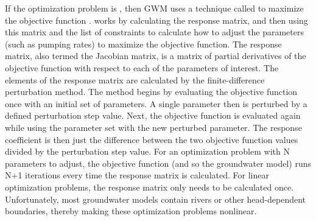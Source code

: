 \documentclass[authoryear]{elsarticle}
\begin{document}
If the optimization problem is , then GWM uses a technique called  to maximize the objective function \citep{ahlfeld2005gwm}.  works by calculating the response matrix, and then using this matrix and the list of constraints to calculate how to adjust the parameters (such as pumping rates) to maximize the objective function. The response matrix, also termed the Jacobian matrix, is a matrix of partial derivatives of the objective function with respect to each of the parameters of interest. The elements of the response matrix are calculated by the finite-difference perturbation method. The method begins by evaluating the objective function once with an initial set of parameters. A single parameter then is perturbed by a defined perturbation step value. Next, the objective function is evaluated again while using the parameter set with the new perturbed parameter. The response coefficient is then just the difference between the two objective function values divided by the perturbation step value. For an optimization problem with N parameters to adjust, the objective function (and so the groundwater model) runs N+1 iterations every time the response matrix is calculated. For linear optimization problems, the response matrix only needs to be calculated once. Unfortunately, most groundwater models contain rivers or other head-dependent boundaries, thereby making these optimization problems nonlinear.

\end{document}
